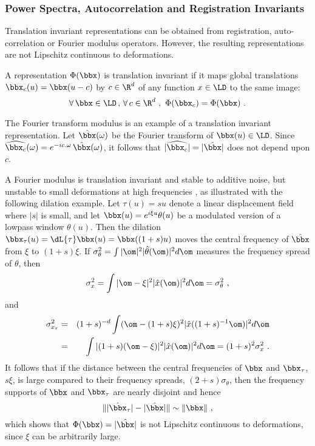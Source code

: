 \subsubsection{Power Spectra, Autocorrelation and Registration Invariants}
\label{transdef}

Translation invariant representations
can be obtained from
registration, auto-correlation or Fourier modulus operators.
However, the resulting representations are
not Lipschitz continuous to deformations.

A representation $\Phi (\bbx)$ is translation invariant %
if it maps global translations $\bbx_c(u) = \bbx(u-c)$ by $c \in \R^d$ 
of any function $x \in \LD$ to the same image:   
\begin{equation}
\label{invar}
\forall \, \bbx \in \LD\,,\,\forall \, c \in \R^d~,~\Phi (\bbx_c) = \Phi (\bbx)~.
\end{equation}

The Fourier transform modulus is an example of a translation invariant
representation. Let  $\hat \bbx (\omega)$ be the Fourier transform of $\bbx(u) \in \LD$.
Since  
$\widehat {\bbx_c} (\omega) = e^{-i c.\omega}\, \hat \bbx(\omega)$, it follows that
$|\widehat {\bbx_c} | = |\hat \bbx|$ does not depend upon $c$.

A  Fourier modulus is translation invariant and stable to additive noise,
but unstable to small deformations at high frequencies \cite{stephane},
as illustrated with the following dilation example.
Let $\tau(u)=su$ denote a linear 
displacement field where $|s|$ is small,
and let $\bbx(u)=e^{i \xi u} \theta(u)$ be a modulated
version of a lowpass window $\theta(u)$. 
Then the dilation $\bbx_\tau(u) = \dL{\tau} \bbx(u)=\bbx((1+s)u)$ 
moves the central
frequency of $\hat{\bbx}$ from $\xi$ to $(1+s) \xi$. 
If $\sigma^2_\theta = \int |\om|^2 |\hat{\theta}(\om)|^2 d\om$ 
measures the frequency spread of $\theta$, 
then 
$$\sigma^2_x=\int |\om-\xi|^2 |\hat{x}(\om)|^2 d\om= \sigma^2_\theta~,$$
and 
\begin{eqnarray*}
\sigma^2_{x_\tau} &=& (1+s)^{-d} \int (\om-(1+s)\xi)^2 |\hat{x}((1+s)^{-1}\om)|^2 d\om \\
&=& \int |(1+s)(\om-\xi)|^2 |\hat{x}(\om)|^2 d\om = (1+s)^2 \sigma^2_x~.
\end{eqnarray*}
It follows that if the distance between 
the central frequencies of $\bbx$ and $\bbx_\tau$,
$s \xi$,  is large compared to their frequency 
spreads, $ (2+s) \sigma_\theta$,
 then the frequency supports of $\bbx$ and $\bbx_\tau$ 
 are nearly disjoint and hence 
 $$\| | \hat{\bbx}_\tau | - | \hat{\bbx} | \| \sim \| \bbx \| ~,$$
which shows that $\Phi(\bbx) = |\hat{\bbx}|$ is not Lipschitz
continuous to deformations, 
since $\xi$ can be arbitrarily large.

